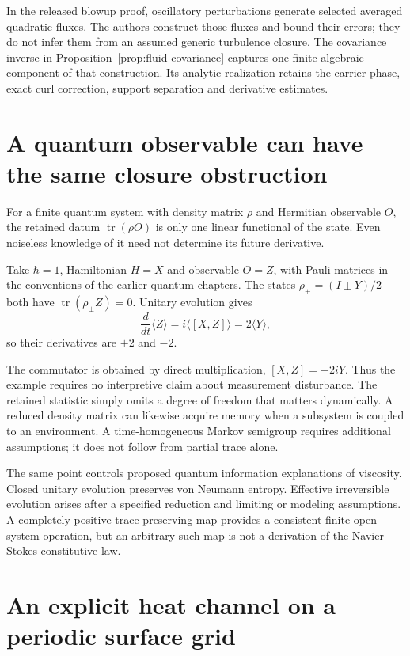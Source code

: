 In the released blowup proof, oscillatory perturbations generate selected averaged quadratic fluxes. The authors construct those fluxes and bound their errors; they do not infer them from an assumed generic turbulence closure. The covariance inverse in Proposition~\ref{prop:fluid-covariance} captures one finite algebraic component of that construction. Its analytic realization retains the carrier phase, exact curl correction, support separation and derivative estimates.

\section{A quantum observable can have the same closure obstruction}

For a finite quantum system with density matrix $\rho$ and Hermitian observable $O$, the retained datum $\operatorname{tr}(\rho O)$ is only one linear functional of the state. Even noiseless knowledge of it need not determine its future derivative.

\begin{example}
Take $\hbar=1$, Hamiltonian $H=X$ and observable $O=Z$, with Pauli matrices in the conventions of the earlier quantum chapters. The states
$\rho_\pm=(I\pm Y)/2$ both have $\operatorname{tr}(\rho_\pm Z)=0$. Unitary evolution gives
\[
 \frac d{dt}\langle Z\rangle=i\langle[X,Z]\rangle=2\langle Y\rangle,
\]
so their derivatives are $+2$ and $-2$.
\end{example}

The commutator is obtained by direct multiplication, $[X,Z]=-2iY$. Thus the example requires no interpretive claim about measurement disturbance. The retained statistic simply omits a degree of freedom that matters dynamically. A reduced density matrix can likewise acquire memory when a subsystem is coupled to an environment. A time-homogeneous Markov semigroup requires additional assumptions; it does not follow from partial trace alone.

The same point controls proposed quantum information explanations of viscosity. Closed unitary evolution preserves von Neumann entropy. Effective irreversible evolution arises after a specified reduction and limiting or modeling assumptions. A completely positive trace-preserving map provides a consistent finite open-system operation, but an arbitrary such map is not a derivation of the Navier--Stokes constitutive law.

\section{An explicit heat channel on a periodic surface grid}

